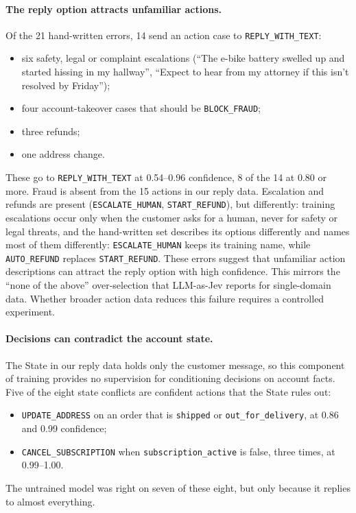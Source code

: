 \documentclass[11pt]{article}
\newcommand{\reply}{\texttt{REPLY\_WITH\_TEXT}}
\begin{document}
\paragraph{The reply option attracts unfamiliar actions.}
Of the 21 hand-written errors, 14 send an action case to \reply{}:
\begin{itemize}
\item six safety, legal or complaint escalations (``The e-bike battery swelled up and started hissing in my hallway'', ``Expect to hear from my attorney if this isn't resolved by Friday'');
\item four account-takeover cases that should be \texttt{BLOCK\_FRAUD};
\item three refunds;
\item one address change.
\end{itemize}
These go to \reply{} at 0.54--0.96 confidence, 8 of the 14 at 0.80 or more. Fraud is absent from the 15 actions in our reply data. Escalation and refunds are present (\texttt{ESCALATE\_HUMAN}, \texttt{START\_REFUND}), but differently: training escalations occur only when the customer asks for a human, never for safety or legal threats, and the hand-written set describes its options differently and names most of them differently: \texttt{ESCALATE\_HUMAN} keeps its training name, while \texttt{AUTO\_REFUND} replaces \texttt{START\_REFUND}. These errors suggest that unfamiliar action descriptions can attract the reply option with high confidence. This mirrors the ``none of the above'' over-selection that LLM-as-Jev reports for single-domain data. Whether broader action data reduces this failure requires a controlled experiment.

\paragraph{Decisions can contradict the account state.}
The State in our reply data holds only the customer message, so this component of training provides no supervision for conditioning decisions on account facts. Five of the eight state conflicts are confident actions that the State rules out:
\begin{itemize}
\item \texttt{UPDATE\_ADDRESS} on an order that is \texttt{shipped} or \texttt{out\_for\_delivery}, at 0.86 and 0.99 confidence;
\item \texttt{CANCEL\_SUBSCRIPTION} when \texttt{subscription\_active} is false, three times, at 0.99--1.00.
\end{itemize}
The untrained model was right on seven of these eight, but only because it replies to almost everything.
\end{document}
